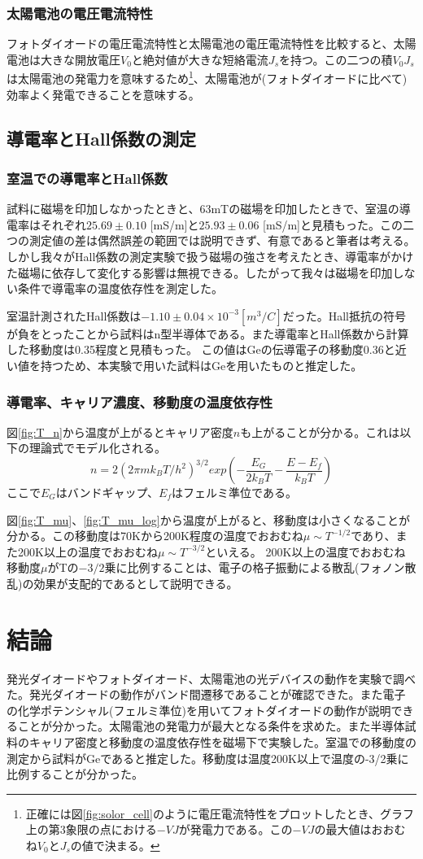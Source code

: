 \documentclass[11pt,a4]{jarticle}
\begin{document}
\subsubsection{太陽電池の電圧電流特性}
フォトダイオードの電圧電流特性と太陽電池の電圧電流特性を比較すると、太陽電池は大きな開放電圧$V_0$と絶対値が大きな短絡電流$J_s$を持つ。この二つの積$V_0J_s$は太陽電池の発電力を意味するため\footnote{正確には図\ref{fig:solor_cell}のように電圧電流特性をプロットしたとき、グラフ上の第3象限の点における$-VJ$が発電力である。この$-VJ$の最大値はおおむね$V_0$と$J_s$の値で決まる。}、太陽電池が(フォトダイオードに比べて)効率よく発電できることを意味する。

\subsection{導電率とHall係数の測定}
\subsubsection{室温での導電率とHall係数}\label{sigma_RT}
\label{sigma_RT}
試料に磁場を印加しなかったときと、63mTの磁場を印加したときで、室温の導電率はそれぞれ$25.69\pm0.10$ [mS/m]と$25.93\pm0.06$ [mS/m]と見積もった。この二つの測定値の差は偶然誤差の範囲では説明できず、有意であると筆者は考える。しかし我々がHall係数の測定実験で扱う磁場の強さを考えたとき、導電率がかけた磁場に依存して変化する影響は無視できる。したがって我々は磁場を印加しない条件で導電率の温度依存性を測定した。

室温計測されたHall係数は$-1.10\pm0.04\times10^{-3}[m^3/C]$だった。Hall抵抗の符号が負をとったことから試料はn型半導体である。また導電率とHall係数から計算した移動度は0.35程度と見積もった。
この値はGeの伝導電子の移動度0.36と近い値を持つため、本実験で用いた試料はGeを用いたものと推定した。

\subsubsection{導電率、キャリア濃度、移動度の温度依存性}
図\ref{fig:T_n}から温度が上がるとキャリア密度$n$も上がることが分かる。これは以下の理論式でモデル化される。
\begin{equation}
n = 2 (2 \pi m k_B T / h^2)^{3/2} exp(-\frac{E_G}{2k_BT}-\frac{E-E_f}{k_BT})
\label{eq:C1-18}
\end{equation}
ここで$E_G$はバンドギャップ、$E_f$はフェルミ準位である。

図\ref{fig:T_mu}、\ref{fig:T_mu_log}から温度が上がると、移動度は小さくなることが分かる。この移動度は70Kから200K程度の温度でおおむね$\mu \sim T^{-1/2}$であり、また200K以上の温度でおおむね$\mu \sim T^{-3/2}$といえる。
200K以上の温度でおおむね移動度$\mu$がTの$-3/2$乗に比例することは、電子の格子振動による散乱(フォノン散乱)の効果が支配的であるとして説明できる。

\section{結論}
発光ダイオードやフォトダイオード、太陽電池の光デバイスの動作を実験で調べた。発光ダイオードの動作がバンド間遷移であることが確認できた。また電子の化学ポテンシャル(フェルミ準位)を用いてフォトダイオードの動作が説明できることが分かった。太陽電池の発電力が最大となる条件を求めた。また半導体試料のキャリア密度と移動度の温度依存性を磁場下で実験した。室温での移動度の測定から試料がGeであると推定した。移動度は温度200K以上で温度の-3/2乗に比例することが分かった。
\end{document}
